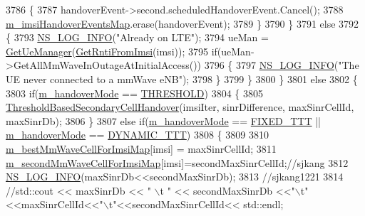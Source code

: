 \begin{DoxyCode}
3786           \{
3787             handoverEvent->second.scheduledHandoverEvent.Cancel();
3788             \hyperlink{classns3_1_1LteEnbRrc_a6f703158e9a4ceaccbd1c5df7f5b0ba1}{m\_imsiHandoverEventsMap}.erase(handoverEvent);
3789           \}
3790         \}
3791         \textcolor{keywordflow}{else}
3792         \{
3793           \hyperlink{group__logging_gafbd73ee2cf9f26b319f49086d8e860fb}{NS\_LOG\_INFO}(\textcolor{stringliteral}{"Already on LTE"});
3794           ueMan = \hyperlink{classns3_1_1LteEnbRrc_a875653948b565dc50b33f6a0434e32d9}{GetUeManager}(\hyperlink{classns3_1_1LteEnbRrc_a98f4b8f727e844ab621e447b7178ddc2}{GetRntiFromImsi}(imsi));
3795           \textcolor{keywordflow}{if}(ueMan->GetAllMmWaveInOutageAtInitialAccess())
3796           \{
3797             \hyperlink{group__logging_gafbd73ee2cf9f26b319f49086d8e860fb}{NS\_LOG\_INFO}(\textcolor{stringliteral}{"The UE never connected to a mmWave eNB"});
3798           \}
3799         \}
3800       \} 
3801       \textcolor{keywordflow}{else}
3802       \{
3803         \textcolor{keywordflow}{if}(\hyperlink{classns3_1_1LteEnbRrc_aa68424e6be8a396baf7fbad34e4dde06}{m\_handoverMode} == \hyperlink{classns3_1_1LteEnbRrc_a92c80910218354db2ad7ac531f896c94adf9f2c22d2fbf5ed241d6dcf5ecccd3a}{THRESHOLD})
3804         \{
3805           \hyperlink{classns3_1_1LteEnbRrc_a03410d7e5f0a8d10c0d641b7444757a3}{ThresholdBasedSecondaryCellHandover}(imsiIter, sinrDifference, 
      maxSinrCellId, maxSinrDb);  
3806         \}
3807         \textcolor{keywordflow}{else} \textcolor{keywordflow}{if}(\hyperlink{classns3_1_1LteEnbRrc_aa68424e6be8a396baf7fbad34e4dde06}{m\_handoverMode} == \hyperlink{classns3_1_1LteEnbRrc_a92c80910218354db2ad7ac531f896c94a6981655eb0cd4438cb9d5903d9b04e1a}{FIXED\_TTT} || 
      \hyperlink{classns3_1_1LteEnbRrc_aa68424e6be8a396baf7fbad34e4dde06}{m\_handoverMode} == \hyperlink{classns3_1_1LteEnbRrc_a92c80910218354db2ad7ac531f896c94a8cdb66e30f4eab71f699079471fbf40f}{DYNAMIC\_TTT})
3808         \{
3809 
3810                 \hyperlink{classns3_1_1LteEnbRrc_a38d5bf3d53b16596824f07d4b4a1eab7}{m\_bestMmWaveCellForImsiMap}[imsi] = maxSinrCellId;
3811                 \hyperlink{classns3_1_1LteEnbRrc_ad32cb1587ac3d86749575bbb747b9071}{m\_secondMmWaveCellForImsiMap}[imsi]=secondMaxSinrCellId;\textcolor{comment}{//sjkang}
3812                 \hyperlink{group__logging_gafbd73ee2cf9f26b319f49086d8e860fb}{NS\_LOG\_INFO}(maxSinrDb<<secondMaxSinrDb);
3813                 \textcolor{comment}{//sjkang1221}
3814                 \textcolor{comment}{//std::cout << maxSinrDb << " \(\backslash\)t " << secondMaxSinrDb
       <<"\(\backslash\)t"<<maxSinrCellId<<"\(\backslash\)t"<<secondMaxSinrCellId<< std::endl;}

\end{DoxyCode}
